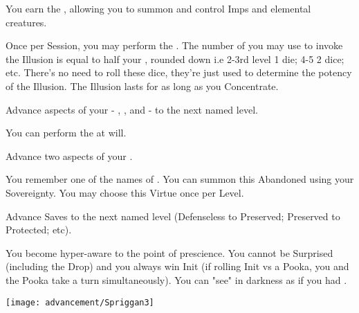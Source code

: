 \begin{multicols*}{2}

You earn the , allowing you to summon and control Imps and elemental creatures.


Once per Session, you may perform the . The number of \DICE you may use to invoke the Illusion is equal to half your \LVL, rounded down i.e 2-3rd level 1 die; 4-5 2 dice; etc. There's no need to roll these dice, they're just used to determine the potency of the Illusion. The Illusion lasts for as long as you Concentrate.




Advance  aspects of your  - \DEATH, \INJURY, and \INSANITY - to the next named level.



You can perform the  at will.


Advance two  aspects of your  \DCUP.



You remember one of the names of . You can summon this Abandoned using your Sovereignty. You may choose this Virtue once per Level. 


Advance  Saves to the next named level (Defenseless to Preserved; Preserved to Protected; etc).



 You become hyper-aware to the point of prescience.  You cannot be Surprised (including the Drop) and you always win Init (if rolling Init vs a Pooka, you and the Pooka take a turn simultaneously). You can "see" in darkness as if you had .

\end{multicols*}

\begin{center}
\texttt{[image: advancement/Spriggan3]}
\end{center}

